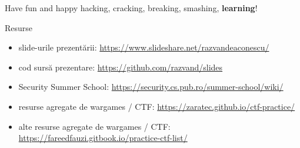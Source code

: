 \documentclass{simple}
\begin{document}
\begin{frame}{}
  \centering
  \LARGE
  Have fun and happy hacking, cracking, breaking, smashing, \textbf{learning}!
\end{frame}

\begin{frame}{Resurse}
  \begin{itemize}
    \item slide-urile prezentării: \url{https://www.slideshare.net/razvandeaconescu/}
    \item cod sursă prezentare: \url{https://github.com/razvand/slides}
    \item Security Summer School: \url{https://security.cs.pub.ro/summer-school/wiki/}
    \item resurse agregate de wargames / CTF: \url{https://zaratec.github.io/ctf-practice/}
    \item alte resurse agregate de wargames / CTF: \url{https://fareedfauzi.gitbook.io/practice-ctf-list/}
  \end{itemize}
\end{frame}
\end{document}
